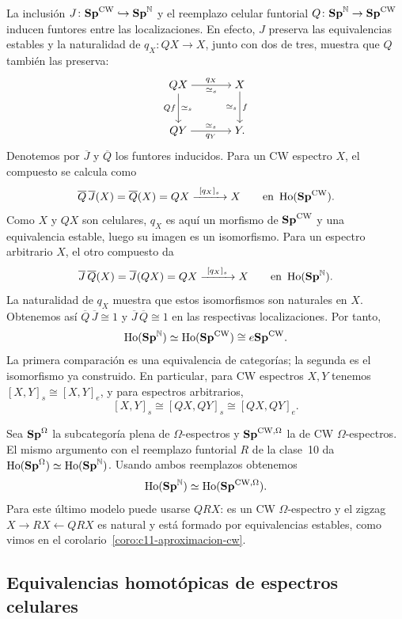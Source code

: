 La inclusión $J\colon\mathbf{Sp}^{\mathrm{CW}}\hookrightarrow\mathbf{Sp}^{\mathbb N}$ y el reemplazo celular funtorial $Q\colon\mathbf{Sp}^{\mathbb N}\to\mathbf{Sp}^{\mathrm{CW}}$ inducen funtores entre las localizaciones. En efecto, $J$ preserva las equivalencias estables y la naturalidad de $q_X\colon QX\to X$, junto con dos de tres, muestra que $Q$ también las preserva:
\[
\begin{tikzcd}[cramped,column sep=large,row sep=large]
QX \arrow[r,"q_X","\simeq_s"'] \arrow[d,"Qf"',"\simeq_s"]
& X \arrow[d,"f","\simeq_s"']\\
QY \arrow[r,"q_Y"',"\simeq_s"] & Y.
\end{tikzcd}
\]
Denotemos por $\overline J$ y $\overline Q$ los funtores inducidos. Para un CW espectro $X$, el compuesto se calcula como
\[
\overline Q\,\overline J(X)=\overline Q(X)=QX
\xrightarrow{\ [q_X]_s\ }X
\qquad\text{en }\operatorname{Ho}(\mathbf{Sp}^{\mathrm{CW}}).
\]
Como $X$ y $QX$ son celulares, $q_X$ es aquí un morfismo de $\mathbf{Sp}^{\mathrm{CW}}$ y una equivalencia estable, luego su imagen es un isomorfismo. Para un espectro arbitrario $X$, el otro compuesto da
\[
\overline J\,\overline Q(X)=\overline J(QX)=QX
\xrightarrow{\ [q_X]_s\ }X
\qquad\text{en }\operatorname{Ho}(\mathbf{Sp}^{\mathbb N}).
\]
La naturalidad de $q_X$ muestra que estos isomorfismos son naturales en $X$. Obtenemos así $\overline Q\,\overline J\cong1$ y $\overline J\,\overline Q\cong1$ en las respectivas localizaciones. Por tanto,
\[
\operatorname{Ho}(\mathbf{Sp}^{\mathbb N})\simeq\operatorname{Ho}(\mathbf{Sp}^{\mathrm{CW}})
\cong e\mathbf{Sp}^{\mathrm{CW}}.
\]
La primera comparación es una equivalencia de categorías; la segunda es el isomorfismo ya construido. En particular, para CW espectros $X,Y$ tenemos $[X,Y]_s\cong[X,Y]_e$, y para espectros arbitrarios,
\[
[X,Y]_s\cong[QX,QY]_s\cong[QX,QY]_e.
\]

Sea $\mathbf{Sp}^\Omega$ la subcategoría plena de $\Omega$-espectros y $\mathbf{Sp}^{\mathrm{CW},\Omega}$ la de CW $\Omega$-espectros. El mismo argumento con el reemplazo funtorial $R$ de la clase~10 da $\operatorname{Ho}(\mathbf{Sp}^\Omega)\simeq\operatorname{Ho}(\mathbf{Sp}^{\mathbb N})$. Usando ambos reemplazos obtenemos
\[
\operatorname{Ho}(\mathbf{Sp}^{\mathbb N})\simeq\operatorname{Ho}(\mathbf{Sp}^{\mathrm{CW},\Omega}).
\]
Para este último modelo puede usarse $QRX$: es un CW $\Omega$-espectro y el zigzag $X\to RX\leftarrow QRX$ es natural y está formado por equivalencias estables, como vimos en el corolario~\ref{coro:c11-aproximacion-cw}.

\subsection{Equivalencias homotópicas de espectros celulares}

